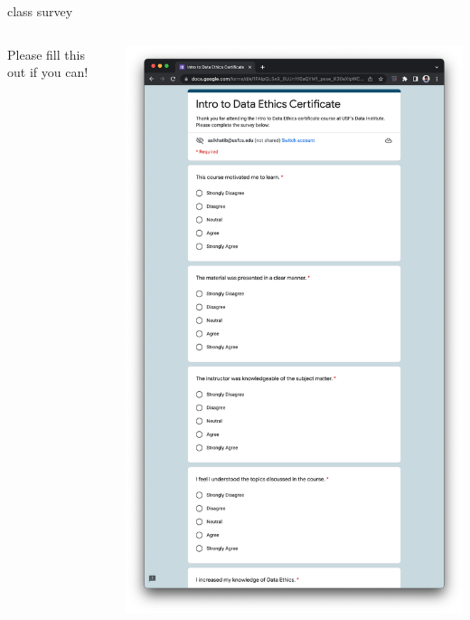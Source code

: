 \documentclass[aspectratio=43,17pt]{beamer} %
\begin{document}
\begin{frame}{class survey}
\begin{columns}
\begin{column}{0.3\textwidth}
{Please fill this out if you can! \MVRightarrow{}}
\end{column}
\begin{column}{0.4\textwidth}
\hspace*{-3em}\includegraphics[width=1.5\textwidth]{figures/survey.png}
\end{column}
\end{columns}

\end{frame}
\end{document}
